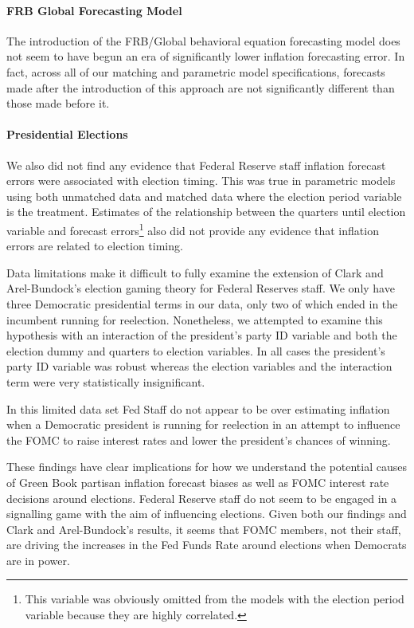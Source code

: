 \documentclass[a4paper]{article}\usepackage{graphicx, color}
\begin{document}
\paragraph{FRB Global Forecasting Model}

The introduction of the FRB/Global behavioral equation forecasting model does not seem to have begun an era of significantly lower inflation forecasting error. In fact, across all of our matching and parametric model specifications, forecasts made after the introduction of this approach are not significantly different than those made before it. 

\paragraph{Presidential Elections}

We also did not find any evidence that Federal Reserve staff inflation forecast errors were associated with election timing. This was true in parametric models using both unmatched data and matched data where the election period variable is the treatment. Estimates of the relationship between the quarters until election variable and forecast errors\footnote{This variable was obviously omitted from the models with the election period variable because they are highly correlated.} also did not provide any evidence that inflation errors are related to election timing. 

Data limitations make it difficult to fully examine the extension of Clark and Arel-Bundock's \citeyearpar{Clark2011} election gaming theory for Federal Reserves staff. We only have three Democratic presidential terms in our data, only two of which ended in the incumbent running for reelection. Nonetheless, we attempted to examine this hypothesis with an interaction of the president's party ID variable and both the election dummy and quarters to election variables. In all cases the president's party ID variable was robust whereas the election variables and the interaction term were very statistically insignificant.

In this limited data set Fed Staff do not appear to be over estimating inflation when a Democratic president is running for reelection in an attempt to influence the FOMC to raise interest rates and lower the president's chances of winning. 

These findings have clear implications for how we understand the potential causes of Green Book partisan inflation forecast biases as well as FOMC interest rate decisions around elections. Federal Reserve staff do not seem to be engaged in a signalling game with the aim of influencing elections. Given both our findings and Clark and Arel-Bundock's results, it seems that FOMC members, not their staff, are driving the increases in the Fed Funds Rate around elections when Democrats are in power. 
\end{document}
